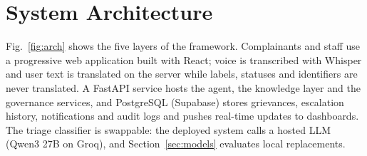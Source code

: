 \documentclass[conference]{IEEEtran}
\begin{document}
\section{System Architecture}

Fig.~\ref{fig:arch} shows the five layers of the framework. Complainants and staff use a progressive web
application built with React; voice is transcribed with Whisper and user text is
translated on the server while labels, statuses and identifiers are never translated. A FastAPI service hosts the
agent, the knowledge layer and the governance services, and PostgreSQL (Supabase) stores grievances, escalation
history, notifications and audit logs and pushes real-time updates to dashboards. The triage classifier is
swappable: the deployed system calls a hosted LLM (Qwen3 27B on Groq), and Section~\ref{sec:models} evaluates
local replacements.
\end{document}
